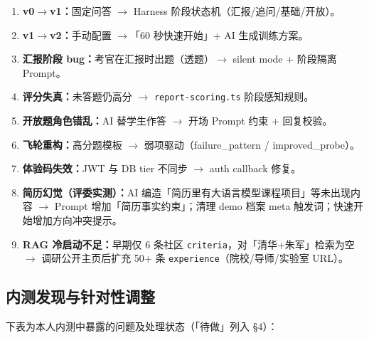 \documentclass[11pt, a4paper]{article}
\begin{document}
\begin{enumerate}
  \item \textbf{v0$\to$v1：}固定问答 $\to$ Harness 阶段状态机（汇报/追问/基础/开放）。
  \item \textbf{v1$\to$v2：}手动配置 $\to$「60 秒快速开始」+ AI 生成训练方案。
  \item \textbf{汇报阶段 bug：}考官在汇报时出题（透题）$\to$ silent mode + 阶段隔离 Prompt。
  \item \textbf{评分失真：}未答题仍高分 $\to$ \texttt{report-scoring.ts} 阶段感知规则。
  \item \textbf{开放题角色错乱：}AI 替学生作答 $\to$ 开场 Prompt 约束 + 回复校验。
  \item \textbf{飞轮重构：}高分题模板 $\to$ 弱项驱动（failure\_pattern / improved\_probe）。
  \item \textbf{体验码失效：}JWT 与 DB tier 不同步 $\to$ auth callback 修复。
  \item \textbf{简历幻觉（评委实测）：}AI 编造「简历里有大语言模型课程项目」等未出现内容 $\to$ Prompt 增加「简历事实约束」；清理 demo 档案 meta 触发词；快速开始增加方向冲突提示。
  \item \textbf{RAG 冷启动不足：}早期仅 6 条社区 \texttt{criteria}，对「清华+朱军」检索为空 $\to$ 调研公开主页后扩充 50+ 条 \texttt{experience}（院校/导师/实验室 URL）。
\end{enumerate}

\subsection{内测发现与针对性调整}

下表为本人内测中暴露的问题及处理状态（「待做」列入 §4）：
\end{document}
